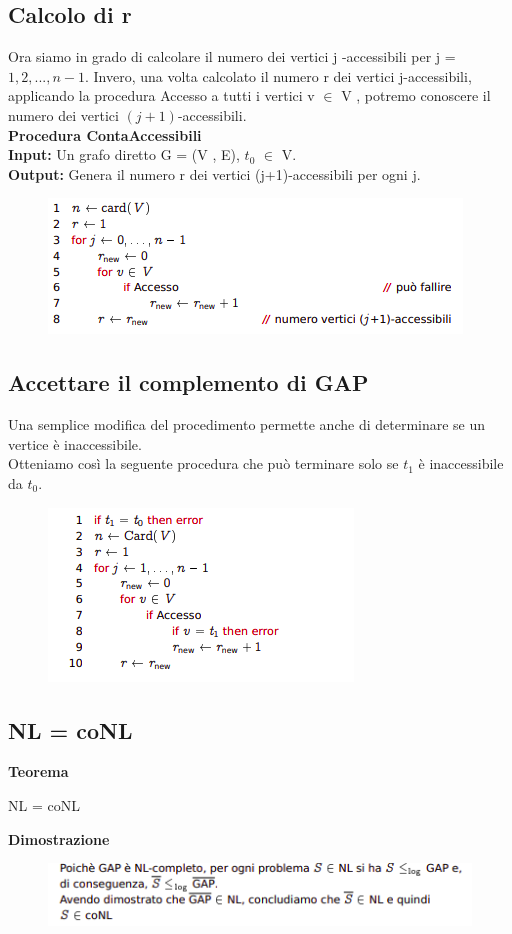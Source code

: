\subsection{Calcolo di r}
Ora siamo in grado di calcolare il numero dei vertici j -accessibili per j = $1, 2,..., n-1$. Invero, una volta calcolato il numero r dei vertici j-accessibili, applicando la procedura Accesso a tutti i vertici v $\in$ V , potremo conoscere il numero dei vertici $(j+1)$-accessibili.
\\\textbf{Procedura ContaAccessibili}\\
\textbf{Input:} Un grafo diretto G = (V , E), $t_0$ $\in$ V.
\\\textbf{Output:} Genera il numero r dei vertici (j+1)-accessibili per ogni j.
\begin{figure}[htp]
    \includegraphics[scale=0.7]{tesi_stile/img/calcolo-di-r.png}
\end{figure}
\newpage
\subsection{Accettare il complemento di GAP}
Una semplice modifica del procedimento permette anche di determinare se
un vertice è inaccessibile.
\\Otteniamo così la seguente procedura che può terminare solo se $t_1$ è
inaccessibile da $t_0$.
\begin{figure}[htp]
    \includegraphics[scale=0.7]{tesi_stile/img/accertare-gap.png}
\end{figure}
\subsection{NL = coNL}
\textbf{Teorema}
\begin{center}
    NL = coNL
\end{center}
\textbf{Dimostrazione}
\begin{figure}[htp]
    \centering
    \includegraphics[scale=0.8]{tesi_stile/img/foto9cap18.png}
\end{figure}
\newpage
